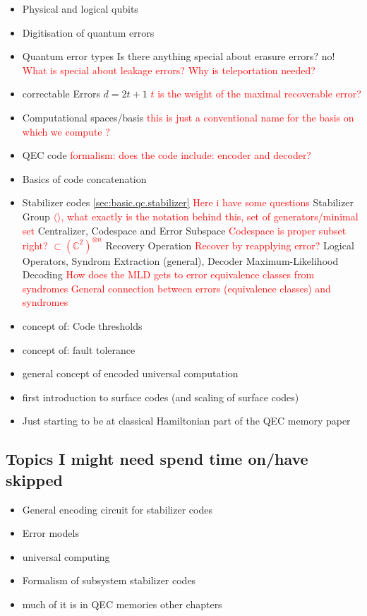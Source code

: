 \begin{itemize}
    \item Physical and logical qubits 
    \item Digitisation of quantum errors
    \item Quantum error types  
    \subitem Is there anything special about erasure errors? no!
    \subitem \textcolor{red}{What is special about leakage errors? Why is teleportation needed?}
    \item correctable Errors $d=2t+1$ 
    \subitem  \textcolor{red}{$t$ is the weight of the maximal recoverable error?}
    \item Computational spaces/basis
    \subitem \textcolor{red}{this is just a conventional name for the basis on which we compute ?}
    \item  QEC code 
    \subitem \textcolor{red}{formalism: does the code include: encoder and decoder?}
    \item Basics of code concatenation
    \item Stabilizer codes \ref{sec:basic.qc.stabilizer} 
    \subitem \textcolor{red}{ Here i have some questions }
    \subitem Stabilizer Group \textcolor{red}{$\langle \rangle$, what exactly is the notation behind this, set of generators/minimal set}
    \subitem Centralizer, 
    \subitem Codespace and Error Subspace
    \subitem \textcolor{red}{Codespace is proper subset right? $\subset (\mathbb{C}^2)^{\otimes n}$}
    \subitem Recovery Operation
    \subitem \textcolor{red}{Recover by reapplying error?}
    \subitem Logical Operators, Syndrom Extraction (general), Decoder
    \subitem Maximum-Likelihood Decoding
    \subitem \textcolor{red}{How does the MLD gets to error equivalence classes from syndromes}
    \subitem \textcolor{red}{General connection between errors (equivalence classes) and syndromes}
    \item concept of: Code thresholds
    \item concept of: fault tolerance  
    \item general concept of encoded universal computation 
    \item first introduction to surface codes (and scaling of surface codes)
    \item Just starting to be at classical Hamiltonian part of the QEC memory paper

\end{itemize}


\subsection{Topics I might need spend time on/have skipped}
\begin{itemize}
    \item General encoding circuit for stabilizer codes
    \item Error models
    \item universal computing 
    \item Formalism of subsystem stabilizer codes
    \item much of it is in QEC memories other chapters 
\end{itemize}